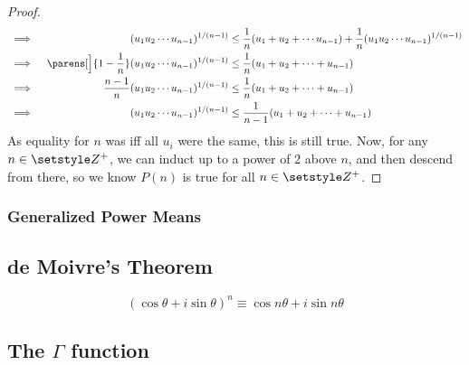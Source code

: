 \begin{proof}
\begin{alignat*}
  &\implies{}& (u_1 u_2 \dotsm u_{n - 1})^{1 / (n - 1)} &\le
          \frac 1n (u_1 + u_2 + \dotsb u_{n - 1}) +
          \frac 1n (u_1 u_2 \dotsm u_{n - 1})^{1 / (n - 1)} \\
  &\implies{}& \parens[\Big]{1 - \frac 1n}
      (u_1 u_2 \dotsm u_{n - 1})^{1 / (n - 1)} &\le
      \frac 1n (u_1 + u_2 + \dotsb + u_{n - 1}) \\
  &\implies{}& \frac {n - 1}n
          (u_1 u_2 \dotsb u_{n - 1})^{1 / (n - 1)} &\le
          \frac 1n (u_1 + u_2 + \dotsb + u_{n - 1}) \\
  &\implies{}& (u_1 u_2 \dotsm u_{n - 1})^{1 / (n - 1)} &\le
          \frac 1{n - 1} (u_1 + u_2 + \dotsb + u_{n - 1})
 \end{alignat*}
 As equality for \(n\) was iff all \(u_i\) were the same, this is still true.
 Now, for any \(n \in \Integers^+\), we can induct up to a power of 2 above
 \(n\), and then descend from there, so we know \(P(n)\) is true for all
 \(n \in \Integers^+\).
\end{proof}

\subsubsection{Generalized Power Means}

\subsection{de Moivre's Theorem}

\begin{equation}
(\cos \theta + i \sin \theta)^n \equiv \cos n\theta + i \sin n\theta
\end{equation}

\subsection[The \texorpdfstring{\(\Gamma\)}{Gamma} function]
           {The \boldmath\(\Gamma\) function}

